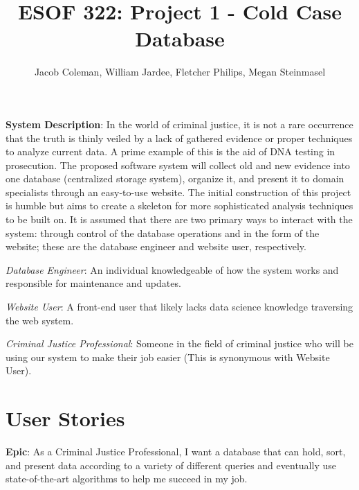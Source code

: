 \documentclass[11pt]{article}
\begin{document}
\title{ESOF 322: Project 1 - Cold Case Database}
\author{Jacob Coleman, William Jardee, Fletcher Philips, Megan Steinmasel}
\maketitle



\textbf{System Description}: In the world of criminal justice, it is not a rare occurrence that the truth is thinly veiled by a lack of gathered evidence or proper techniques to analyze current data. A prime example of this is the aid of DNA testing in prosecution. The proposed software system will collect old and new evidence into one database (centralized storage system), organize it, and present it to domain specialists through an easy-to-use website. The initial construction of this project is humble but aims to create a skeleton for more sophisticated analysis techniques to be built on. It is assumed that there are two primary ways to interact with the system: through control of the database operations and in the form of the website; these are the database engineer and website user, respectively.\vspace{1.5em}

\textit{Database Engineer}: An individual knowledgeable of how the system works and responsible for maintenance and updates.\vspace{0.5em}

\textit{Website  User}: A front-end user that likely lacks data science knowledge traversing the web system.\vspace{0.5em}

\textit{Criminal Justice Professional}: Someone in the field of criminal justice who will be using our system to make their job easier (This is synonymous with Website User).\vspace{0.5em}

\vspace{1em}


\section*{User Stories}

\noindent\textbf{Epic}: As a Criminal Justice Professional, I want a database that can hold, sort, and present data according to a variety of different queries and eventually use state-of-the-art algorithms to help me succeed in my job.\vspace{0.5em}
\end{document}
